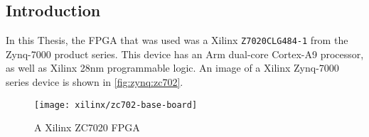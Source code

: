\subsection{Introduction}
\label{zynq:introduction}
\nocite{Zynq7000:ProductBrief,Zynq7000:UserGuide}
In this Thesis, the \gls{FPGA} that was used was a
Xilinx\textsuperscript{\textregistered} \verb+Z7020CLG484-1+ from the Zynq-7000
product series. This device has an Arm\textsuperscript{\textregistered}
dual-core Cortex\textsuperscript{\texttrademark}-A9 processor, as well as
Xilinx 28nm programmable logic. An image of a
Xilinx\textsuperscript{\textregistered} Zynq-7000 series device is shown in
\autoref{fig:zynq:zc702}.

\begin{figure}
    \centering
    \texttt{[image: xilinx/zc702-base-board]}
    \caption{A Xilinx ZC7020 \gls{FPGA}}
    \label{fig:zynq:zc702}
\end{figure}

